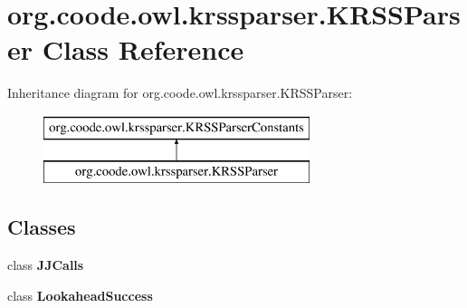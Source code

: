\hypertarget{classorg_1_1coode_1_1owl_1_1krssparser_1_1_k_r_s_s_parser}{\section{org.\-coode.\-owl.\-krssparser.\-K\-R\-S\-S\-Parser Class Reference}
\label{classorg_1_1coode_1_1owl_1_1krssparser_1_1_k_r_s_s_parser}
}
Inheritance diagram for org.\-coode.\-owl.\-krssparser.\-K\-R\-S\-S\-Parser\-:\begin{figure}[H]
\begin{center}
\leavevmode
\includegraphics[height=2.000000cm]{classorg_1_1coode_1_1owl_1_1krssparser_1_1_k_r_s_s_parser}
\end{center}
\end{figure}
\subsection*{Classes}
\begin{DoxyCompactItemize}
\item 
class {\bfseries J\-J\-Calls}
\item 
class {\bfseries Lookahead\-Success}
\end{DoxyCompactItemize}
